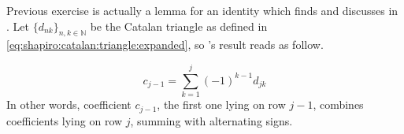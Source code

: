 Previous exercise is actually a lemma for an identity which
\citeauthor{eplett:1979} finds and discusses in \cite{eplett:1979}.  Let
$\lbrace d_{nk}\rbrace_{n,k\in\mathbb{N}}$ be the Catalan triangle as defined
in \autoref{eq:shapiro:catalan:triangle:expanded}, so \citeauthor{eplett:1979}'s
result reads as follow.

\begin{theorem}
    \begin{displaymath}                
        c_{j-1}=\sum_{k=1}^{j}{(-1)^{k-1}d_{jk}}
    \end{displaymath}                
    In other words, coefficient $c_{j-1}$, the first one lying on row $j-1$,
    combines coefficients lying on row $j$, summing with alternating signs.
    \label{thm:eplett:identity}
\end{theorem}
